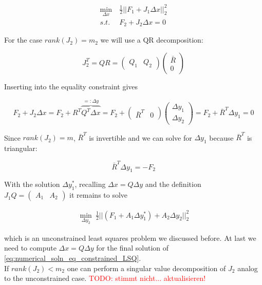 \documentclass{scrartcl}[12pt, halfparskip]
\newcommand{\todo}[1]{\textcolor{red}{TODO: #1}}
\begin{document}
\begin{align}
	\min_{\Delta x} & \ \frac{1}{2} || F_1 + J_1 \Delta x ||_2^2 \label{eq:numerical_soln_eq_constrained_LSQ} \\
	s.t. & \ F_2 + J_2 \Delta x = 0 \nonumber
\end{align}

For the case $rank(J_2)=m_2$ we will use a QR decomposition:

\begin{equation}
	J_2^T = Q R = 
	\begin{pmatrix}
		Q_1 & Q_2
	\end{pmatrix}
	\begin{pmatrix}
		\bar{R} \\
		0
	\end{pmatrix}
\end{equation}

Inserting into the equality constraint gives

\begin{equation}
	F_2 + J_2 \Delta x = F_2 + R^T \overbrace{Q^T \Delta x}^{=: \Delta y} = F_2 +
	\begin{pmatrix}
		\bar{R}^T & 0
	\end{pmatrix} 
	\begin{pmatrix}
		\Delta y_1 \\
		\Delta y_2
	\end{pmatrix} = F_2 + \bar{R}^T \Delta y_1 = 0
\end{equation}

Since $rank(J_2)=m$, $\bar{R}^T$ is invertible and we can solve for $\Delta y_1$ because $\bar{R}^T$ is triangular:

\begin{equation}
	\bar{R}^T \Delta y_1 = -F_2
\end{equation}

With the solution $\Delta y_1^*$, recalling $\Delta x = Q \Delta y$ and the definition $J_1 Q = \begin{pmatrix} A_1 & A_2 \end{pmatrix}$ it remains to solve

\begin{align}
	\min_{\Delta y_2} \ \frac{1}{2} || (F_1 + A_1 \Delta y_1^*) + A_2 \Delta y_2 ||_2^2
\end{align}

which is an unconstrained least squares problem we discussed before. At last we need to compute $\Delta x = Q \Delta y$ for the final solution of \eqref{eq:numerical_soln_eq_constrained_LSQ}. \\
If $rank(J_2) < m_2$ one can perform a singular value decomposition of $J_2$ analog to the unconstrained case. \todo{stimmt nicht... aktualisieren!}
\end{document}
